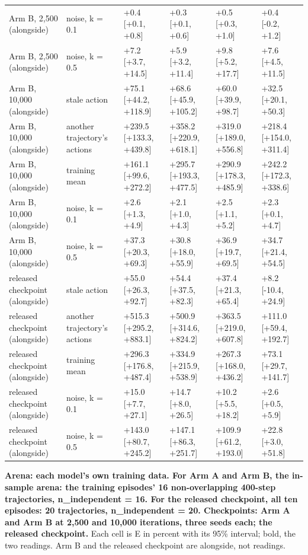 \documentclass[10pt]{article}
\begin{document}
\begin{center}
{\begin{tabular}{llllll}
Arm B, 2,500 (alongside) & noise, k = 0.1 & +0.4 [+0.1, +0.8] & +0.3 [+0.1, +0.6] & +0.5 [+0.3, +1.0] & +0.4 [-0.2, +1.2] \\
Arm B, 2,500 (alongside) & noise, k = 0.5 & +7.2 [+3.7, +14.5] & +5.9 [+3.2, +11.4] & +9.8 [+5.2, +17.7] & +7.6 [+4.5, +11.5] \\
Arm B, 10,000 (alongside) & stale action & +75.1 [+44.2, +118.9] & +68.6 [+45.9, +105.2] & +60.0 [+39.9, +98.7] & +32.5 [+20.1, +50.3] \\
Arm B, 10,000 (alongside) & another trajectory's actions & +239.5 [+133.3, +439.8] & +358.2 [+220.9, +618.1] & +319.0 [+189.0, +556.8] & +218.4 [+154.0, +311.4] \\
Arm B, 10,000 (alongside) & training mean & +161.1 [+99.6, +272.2] & +295.7 [+193.3, +477.5] & +290.9 [+178.3, +485.9] & +242.2 [+172.3, +338.6] \\
Arm B, 10,000 (alongside) & noise, k = 0.1 & +2.6 [+1.3, +4.9] & +2.1 [+1.0, +4.3] & +2.5 [+1.1, +5.2] & +2.3 [+0.1, +4.7] \\
Arm B, 10,000 (alongside) & noise, k = 0.5 & +37.3 [+20.3, +69.3] & +30.8 [+18.0, +55.9] & +36.9 [+19.7, +69.5] & +34.7 [+21.4, +54.5] \\
released checkpoint (alongside) & stale action & +55.0 [+26.3, +92.7] & +54.4 [+37.5, +82.3] & +37.4 [+21.3, +65.4] & +8.2 [-10.4, +24.9] \\
released checkpoint (alongside) & another trajectory's actions & +515.3 [+295.2, +883.1] & +500.9 [+314.6, +824.2] & +363.5 [+219.0, +607.8] & +111.0 [+59.4, +192.7] \\
released checkpoint (alongside) & training mean & +296.3 [+176.8, +487.4] & +334.9 [+215.9, +538.9] & +267.3 [+168.0, +436.2] & +73.1 [+29.7, +141.7] \\
released checkpoint (alongside) & noise, k = 0.1 & +15.0 [+7.7, +27.1] & +14.7 [+8.0, +26.5] & +10.2 [+5.5, +18.2] & +2.6 [+0.5, +5.9] \\
released checkpoint (alongside) & noise, k = 0.5 & +143.0 [+80.7, +245.2] & +147.1 [+86.3, +251.7] & +109.9 [+61.2, +193.0] & +22.8 [+3.0, +51.8] \\
\bottomrule\end{tabular}}\end{center}

\textbf{Arena: each model's own training data. For Arm A and Arm B, the in-sample arena: the training episodes' 16 non-overlapping 400-step trajectories, n\_independent = 16. For the released checkpoint, all ten episodes: 20 trajectories, n\_independent = 20. Checkpoints: Arm A and Arm B at 2,500 and 10,000 iterations, three seeds each; the released checkpoint.} Each cell is E in percent with its 95\% interval; bold, the two readings. Arm B and the released checkpoint are alongside, not readings.
\end{document}
